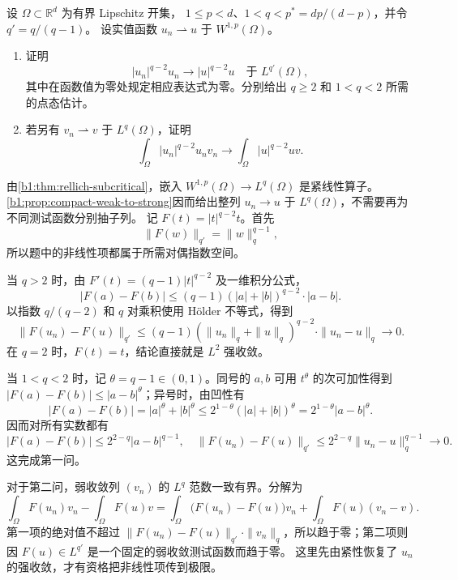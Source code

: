 \begin{optionalexercise}\label{b1:ex:25-nonlinear-reaction-limit}
设 \(\Omega\subset\mathbb R^d\) 为有界 Lipschitz 开集，
\(1\le p<d\)、\(1<q<p^*=dp/(d-p)\)，并令 \(q'=q/(q-1)\)。
设实值函数 \(u_n\rightharpoonup u\) 于 \(W^{1,p}(\Omega)\)。
\begin{enumerate}
 \item\label{b1:item:25-reaction-strong-limit}
 证明
 \[
  |u_n|^{q-2}u_n\longrightarrow |u|^{q-2}u
                       \quad\text{于 }L^{q'}(\Omega),
 \]
 其中在函数值为零处规定相应表达式为零。分别给出 \(q\ge2\) 和
 \(1<q<2\) 所需的点态估计。
 \item\label{b1:item:25-reaction-strong-weak-pairing}
 若另有 \(v_n\rightharpoonup v\) 于 \(L^q(\Omega)\)，证明
 \[
  \int_\Omega |u_n|^{q-2}u_n v_n
          \longrightarrow\int_\Omega |u|^{q-2}u v.
 \]
\end{enumerate}
\end{optionalexercise}
\begin{solution}
由\cref{b1:thm:rellich-subcritical}，嵌入
\(W^{1,p}(\Omega)\to L^q(\Omega)\) 是紧线性算子。\cref{b1:prop:compact-weak-to-strong}因而给出整列
\(u_n\to u\) 于 \(L^q(\Omega)\)，不需要再为不同测试函数分别抽子列。
记 \(F(t)=|t|^{q-2}t\)。首先
\[
 \|F(w)\|_{q'}=\|w\|_q^{q-1},
\]
所以题中的非线性项都属于所需对偶指数空间。

当 \(q>2\) 时，由 \(F'(t)=(q-1)|t|^{q-2}\) 及一维积分公式，
\[
 |F(a)-F(b)|
       \le(q-1)(|a|+|b|)^{q-2}\cdot|a-b|.
\]
以指数 \(q/(q-2)\) 和 \(q\) 对乘积使用 Hölder 不等式，得到
\[
 \|F(u_n)-F(u)\|_{q'}
 \le(q-1)(\|u_n\|_q+\|u\|_q)^{q-2}
                              \cdot\|u_n-u\|_q
 \longrightarrow0.
\]
在 \(q=2\) 时，\(F(t)=t\)，结论直接就是 \(L^2\) 强收敛。

当 \(1<q<2\) 时，记 \(\theta=q-1\in(0,1)\)。同号的 \(a,b\) 可用
\(t^\theta\) 的次可加性得到
\(|F(a)-F(b)|\le|a-b|^\theta\)；异号时，由凹性有
\[
 |F(a)-F(b)|
   =|a|^\theta+|b|^\theta
   \le2^{1-\theta}(|a|+|b|)^\theta
   =2^{1-\theta}|a-b|^\theta.
\]
因而对所有实数都有
\[
 |F(a)-F(b)|\le2^{2-q}|a-b|^{q-1},
 \quad
 \|F(u_n)-F(u)\|_{q'}
                  \le2^{2-q}\|u_n-u\|_q^{q-1}\longrightarrow0.
\]
这完成第一问。

对于第二问，弱收敛列 \((v_n)\) 的 \(L^q\) 范数一致有界。分解为
\[
 \int_\Omega F(u_n)v_n-\int_\Omega F(u)v
   =\int_\Omega\bigl(F(u_n)-F(u)\bigr)v_n
                       +\int_\Omega F(u)(v_n-v).
\]
第一项的绝对值不超过
\(\|F(u_n)-F(u)\|_{q'}\cdot\|v_n\|_q\)，所以趋于零；第二项则因
\(F(u)\in L^{q'}\) 是一个固定的弱收敛测试函数而趋于零。
这里先由紧性恢复了 \(u_n\) 的强收敛，才有资格把非线性项传到极限。
\end{solution}

